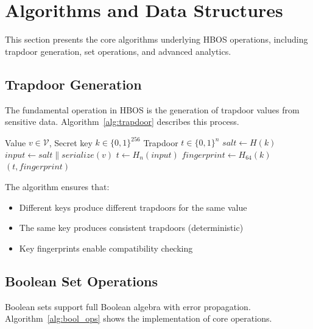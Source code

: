 \documentclass[../main_comprehensive.tex]{subfiles}
\begin{document}
\section{Algorithms and Data Structures}
\label{sec:algorithms}

This section presents the core algorithms underlying HBOS operations, including trapdoor generation, set operations, and advanced analytics.

\subsection{Trapdoor Generation}

The fundamental operation in HBOS is the generation of trapdoor values from sensitive data. Algorithm~\ref{alg:trapdoor} describes this process.

\begin{algorithm}
\caption{Trapdoor Generation}
\label{alg:trapdoor}
\begin{algorithmic}[1]
\REQUIRE Value $v \in \mathcal{V}$, Secret key $k \in \{0,1\}^{256}$
\ENSURE Trapdoor $t \in \{0,1\}^n$
\STATE $salt \leftarrow H(k)$ 
\STATE $input \leftarrow salt \| serialize(v)$ 
\STATE $t \leftarrow H_{n}(input)$ 
\STATE $fingerprint \leftarrow H_{64}(k)$ 
\RETURN $(t, fingerprint)$
\end{algorithmic}
\end{algorithm}

The algorithm ensures that:
\begin{itemize}
\item Different keys produce different trapdoors for the same value
\item The same key produces consistent trapdoors (deterministic)
\item Key fingerprints enable compatibility checking
\end{itemize}

\subsection{Boolean Set Operations}

Boolean sets support full Boolean algebra with error propagation. Algorithm~\ref{alg:bool_ops} shows the implementation of core operations.
\end{document}
